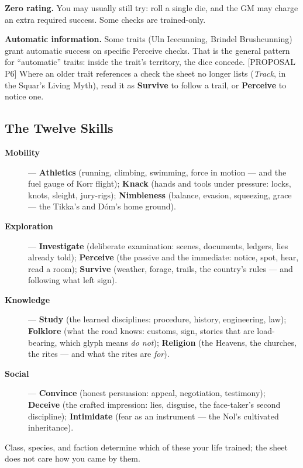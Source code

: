 \textbf{Zero rating.} You may usually still try: roll a single die, and the GM may charge an extra required success. Some checks are trained-only.

\textbf{Automatic information.} Some traits (Uln Icecunning, Brindel Brushcunning) grant automatic success on specific Perceive checks. That is the general pattern for ``automatic'' traits: inside the trait's territory, the dice concede. [PROPOSAL P6] Where an older trait references a check the sheet no longer lists (\textit{Track}, in the Squar's Living Myth), read it as \textbf{Survive} to follow a trail, or \textbf{Perceive} to notice one.

\subsection{The Twelve Skills}

\begin{description}
    \item[\textbf{Mobility}] --- \textbf{Athletics} (running, climbing, swimming, force in motion --- and the fuel gauge of Korr flight); \textbf{Knack} (hands and tools under pressure: locks, knots, sleight, jury-rigs); \textbf{Nimbleness} (balance, evasion, squeezing, grace --- the Tikka's and Dóm's home ground).
    \item[\textbf{Exploration}] --- \textbf{Investigate} (deliberate examination: scenes, documents, ledgers, lies already told); \textbf{Perceive} (the passive and the immediate: notice, spot, hear, read a room); \textbf{Survive} (weather, forage, trails, the country's rules --- and following what left sign).
    \item[\textbf{Knowledge}] --- \textbf{Study} (the learned disciplines: procedure, history, engineering, law); \textbf{Folklore} (what the road knows: customs, sign, stories that are load-bearing, which glyph means \textit{do not}); \textbf{Religion} (the Heavens, the churches, the rites --- and what the rites are \textit{for}).
    \item[\textbf{Social}] --- \textbf{Convince} (honest persuasion: appeal, negotiation, testimony); \textbf{Deceive} (the crafted impression: lies, disguise, the face-taker's second discipline); \textbf{Intimidate} (fear as an instrument --- the Nol's cultivated inheritance).
\end{description}

Class, species, and faction determine which of these your life trained; the sheet does not care how you came by them.

